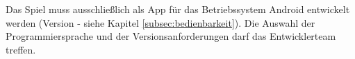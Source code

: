 Das Spiel \gls{muss} ausschließlich als App für das Betriebssystem Android entwickelt werden (Version - siehe Kapitel \ref{subsec:bedienbarkeit}). Die Auswahl der Programmiersprache und der Versionsanforderungen darf das Entwicklerteam treffen.